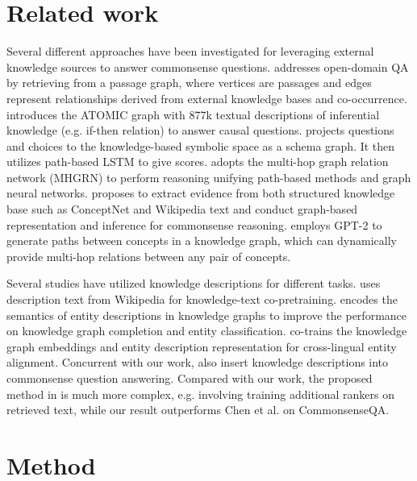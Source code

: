 \documentclass[11pt,a4paper]{article}
\begin{document}
\section{Related work}
\label{sec:rw}
Several different approaches have been investigated for leveraging external knowledge sources to answer commonsense questions. 
\citet{min2019knowledge} addresses open-domain QA by retrieving from a passage graph, where vertices are passages and edges represent relationships derived from external knowledge bases and co-occurrence. \citet{sap2019atomic} introduces the ATOMIC graph with 877k textual descriptions of inferential knowledge (e.g. if-then relation) to answer causal questions. \citet{kagnet} projects questions and choices to the knowledge-based symbolic space as a schema graph. It then utilizes path-based LSTM to give scores. \citet{feng2020scalable} adopts the multi-hop graph relation network (MHGRN) to perform reasoning unifying path-based methods and graph neural networks. \citet{lv2020graph} proposes to extract evidence from both structured knowledge base such as ConceptNet and Wikipedia text and conduct graph-based representation and inference for commonsense reasoning. \citet{wang2020connecting} employs GPT-2 to generate paths between concepts in a knowledge graph, which can dynamically provide multi-hop relations between any pair of concepts.

Several studies have utilized knowledge descriptions for different tasks. \citet{yu2020jaket} uses description text from Wikipedia for knowledge-text co-pretraining. \citet{xie2016representation} encodes the semantics of entity descriptions in knowledge graphs to improve the performance on knowledge graph completion and entity classification. \citet{chen2018co} co-trains the knowledge graph embeddings and entity description representation for cross-lingual entity alignment. Concurrent with our work, \citet{chen-etal-2020-improving-commonsense} also insert knowledge descriptions into commonsense question answering. Compared with our work, the proposed method in \citet{chen-etal-2020-improving-commonsense} is much more complex, e.g. involving training additional rankers on retrieved text, while our result outperforms Chen et al. on CommonsenseQA. 


\section{Method}
\label{sec:method}
\end{document}

